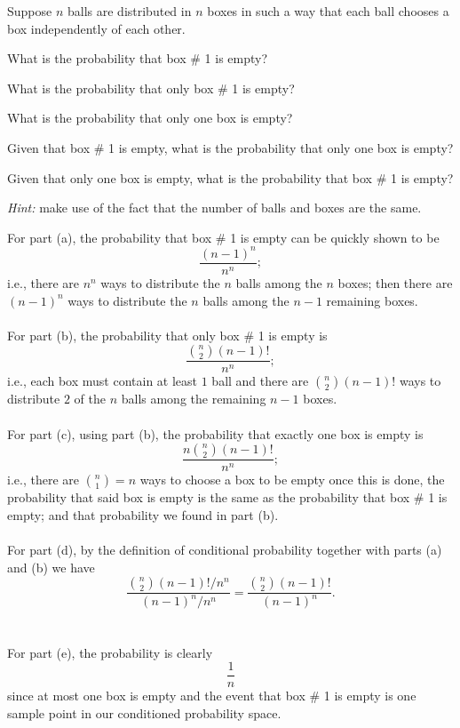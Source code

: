 \begin{problem}
  Suppose \(n\) balls are distributed in \(n\) boxes in such a way that
  each ball chooses a box independently of each other.
  \begin{alphlist}
  \item What is the probability that box \# 1 is empty?
  \item What is the probability that only box \# 1 is empty?
  \item What is the probability that only one box is empty?
  \item Given that box \# 1 is empty, what is the probability that only one
    box is empty?
  \item Given that only one box is empty, what is the probability that box
    \# 1 is empty?
  \end{alphlist}

  \noindent\emph{Hint:} make use of the fact that the number of balls and
  boxes are the same.
\end{problem}
\begin{solution*}
  For part (a), the probability that box \# 1 is empty can be quickly shown
  to be
  \[
    \frac{(n-1)^n}{n^n};
  \]
  i.e., there are \(n^n\) ways to distribute the \(n\) balls among the
  \(n\) boxes; then there are \((n-1)^n\) ways to distribute the \(n\)
  balls among the \(n-1\) remaining boxes.
  \\\\
  For part (b), the probability that only box \# 1 is empty is
  \[
    \frac{\binom{n}{2}(n-1)!}{n^n};
  \]
  i.e., each box must contain at least \(1\) ball and there are
  \(\binom{n}{2}(n-1)!\) ways to distribute \(2\) of the \(n\) balls among
  the remaining \(n-1\) boxes.
  \\\\
  For part (c), using part (b), the probability that exactly one box is
  empty is
  \[
    \frac{n\binom{n}{2}(n-1)!}{n^n};
  \]
  i.e., there are \(\binom{n}{1}=n\) ways to choose a box to be empty once
  this is done, the probability that said box is empty is the same as the
  probability that box \# 1 is empty; and that probability we found in part
  (b).
  \\\\
  For part (d), by the definition of conditional probability together with
  parts (a) and (b) we have
  \[
    \frac{\binom{n}{2}(n-1)!/n^n}{(n-1)^n/n^n}=\frac{\binom{n}{2}(n-1)!}{(n-1)^n}.
  \]
  \\\\
  For part (e), the probability is clearly
  \[
    \frac{1}{n}
  \]
  since at most one box is empty and the event that box \# 1 is empty is
  one sample point in our conditioned probability space.
\end{solution*}

